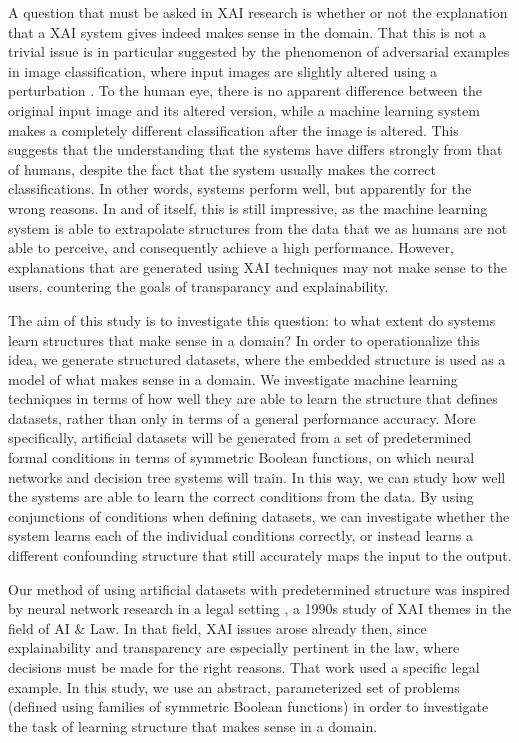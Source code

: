 \documentclass[letterpaper]{article} %
\begin{document}
A question that must be asked in XAI research is whether or not the explanation that a XAI system gives indeed makes sense in the domain. That this is not a trivial issue is in particular suggested by the phenomenon of adversarial examples in image classification, where input images are slightly altered using a perturbation \cite{yuan2017adversarial}. To the human eye, there is no apparent difference between the original input image and its altered version, while a machine learning system makes a completely different classification after the image is altered. This suggests that the understanding that the systems have differs strongly from that of humans, despite the fact that the system usually makes the correct classifications. In other words, systems perform well, but apparently for the wrong reasons. In and of itself, this is still impressive, as the machine learning system is able to extrapolate structures from the data that we as humans are not able to perceive, and consequently achieve a high performance. However, explanations that are generated using XAI techniques may not make sense to the users, countering the goals of transparancy and explainability. 

The aim of this study is to investigate this question: to what extent do systems learn structures that make sense in a domain? In order to operationalize this idea, we generate structured datasets, where the embedded structure is used as a model of what makes sense in a domain. We investigate machine learning techniques in terms of how well they are able to learn the structure that defines datasets, rather than only in terms of a general performance accuracy. More specifically, artificial datasets will be generated from a set of predetermined formal conditions in terms of symmetric Boolean functions, on which neural networks and decision tree systems will train. In this way, we can study how well the systems are able to learn the correct conditions from the data. 
By using conjunctions of conditions when defining datasets, 
we can investigate whether the system learns each of the individual conditions correctly, or instead learns a different confounding structure that still accurately maps the input to the output. 

Our method of using artificial datasets with predetermined structure was inspired by neural network research in a legal setting \cite{bench1993neural}, a 1990s study of XAI themes in the field of AI \& Law. In that field, XAI issues arose already then, since explainability and transparency are especially pertinent in the law, where decisions must be made for the right reasons. That work used a specific legal example. In this study, we use an abstract, parameterized set of problems (defined using families of symmetric Boolean functions) in order to investigate the task of learning structure that makes sense in a domain. %
\end{document}
